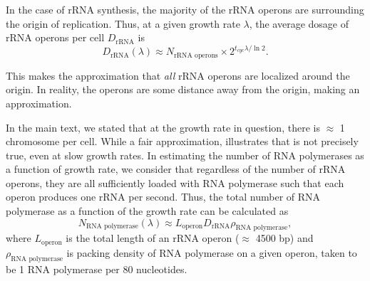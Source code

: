 In the case of rRNA synthesis,  the majority of the rRNA operons are surrounding
the origin of replication. Thus, at a given growth rate $\lambda$, the average
dosage of rRNA operons per cell $D_\text{rRNA}$ is 
\begin{equation}
D_\text{rRNA}(\lambda) \approx N_\text{rRNA operons} \times 2^{t_{cyc} \lambda / \ln 2}.
\label{eq:rRNA_dosage}
\end{equation}

This makes the approximation that \textit{all} rRNA operons are localized around
the origin. In reality, the operons are some distance away from the origin,
making  an approximation. 

In the main text, we stated that at the growth rate in question, there is
$\approx$ 1 chromosome per cell. While a fair approximation, 
illustrates that is not precisely true, even at slow growth rates. In estimating
the number of RNA polymerases as a function of growth rate, we consider that
regardless of the number of rRNA operons, they are all sufficiently loaded with
RNA polymerase such that each operon produces one rRNA per second. Thus, the
total number of RNA polymerase as a function of the growth rate can be
calculated as 
\begin{equation}
    N_\text{RNA polymerase}(\lambda) \approx L_\text{operon}D_\text{rRNA}\rho_\text{RNA polymerase},
\end{equation}
where $L_\text{operon}$ is the total length of an rRNA operon ($\approx$ 4500
bp) and $\rho_\text{RNA polymerase}$ is packing density of RNA polymerase on a
given operon, taken to be 1 RNA polymerase per 80 nucleotides.
 



